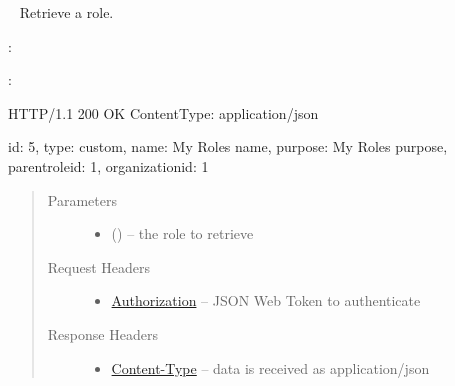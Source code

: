 \documentclass[letterpaper,10pt,english]{sphinxmanual}
\begin{document}
\begin{fulllineitems}
\label{\detokenize{resources/role:get--roles-(role_id)}}~
Retrieve a role.

:

\begin{sphinxVerbatim}[commandchars=\\\{\}]
  
 
 
\end{sphinxVerbatim}

:

\begin{sphinxVerbatim}[commandchars=\\\{\}]
HTTP/1.1 200 OK
Content\PYGZhy{}Type: application/json

\PYGZob{}
    \PYGZsq{}id\PYGZsq{}: 5,
    \PYGZsq{}type\PYGZsq{}: \PYGZsq{}custom\PYGZsq{},
    \PYGZsq{}name\PYGZsq{}: \PYGZsq{}My Role\PYGZsq{}s name\PYGZsq{},
    \PYGZsq{}purpose\PYGZsq{}: \PYGZsq{}My Role\PYGZsq{}s purpose\PYGZsq{},
    \PYGZsq{}parent\PYGZus{}role\PYGZus{}id\PYGZsq{}: 1,
    \PYGZsq{}organization\PYGZus{}id\PYGZsq{}: 1
\PYGZcb{}
\end{sphinxVerbatim}
\begin{quote}\begin{description}
\item[{Parameters}] \leavevmode\begin{itemize}
\item {} 
 () -- the role to retrieve

\end{itemize}

\item[{Request Headers}] \leavevmode\begin{itemize}
\item {} 
\href{http://tools.ietf.org/html/rfc7235\#section-4.2}{Authorization} -- JSON Web Token to authenticate

\end{itemize}

\item[{Response Headers}] \leavevmode\begin{itemize}
\item {} 
\href{http://tools.ietf.org/html/rfc7231\#section-3.1.1.5}{Content-Type} -- data is received as application/json


\end{itemize}
\end{description}
\end{quote}
\end{fulllineitems}
\end{document}
